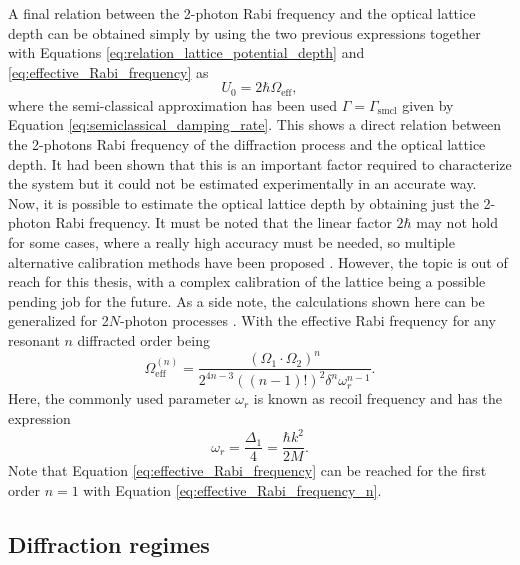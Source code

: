 A final relation between the 2-photon Rabi frequency and the optical lattice depth can be obtained simply by using the two previous expressions together with Equations \eqref{eq:relation_lattice_potential_depth} and \eqref{eq:effective_Rabi_frequency} as \cite{Ovchinnikov1999}
\begin{equation}\label{eq:relation_rabi_frequency_lattice_depth}
	U_0 = 2\hbar\Omega_\text{eff},
\end{equation}
where the semi-classical approximation has been used $\Gamma=\Gamma_\text{smcl}$ given by Equation \eqref{eq:semiclassical_damping_rate}. This shows a direct relation between the 2-photons Rabi frequency of the diffraction process and the optical lattice depth. It had been shown that this is an important factor required to characterize the system but it could not be estimated experimentally in an accurate way. Now, it is possible to estimate the optical lattice depth by obtaining just the 2-photon Rabi frequency. It must be noted that the linear factor $2\hbar$ may not hold for some cases, where a really high accuracy must be needed, so multiple alternative calibration methods have been proposed \cite{Ovchinnikov1999,Cabrera2018, Friebel1998,Cristiani2002}. However, the topic is out of reach for this thesis, with a complex calibration of the lattice being a possible pending job for the future. As a side note, the calculations shown here can be generalized for 2$N$-photon processes \cite{Giltner1995}. With the effective Rabi frequency for any resonant $n$ diffracted order being
\begin{equation}\label{eq:effective_Rabi_frequency_n}
	\Omega_\text{eff}^{(n)} = \frac{(\Omega_1 \cdot \Omega_2)^n}{2^{4n-3}((n-1)!)^2\delta^n\omega_r^{n-1}}.
\end{equation}
Here, the commonly used  parameter $\omega_r$ is known as recoil frequency and has the expression
\begin{equation}
	\omega_r = \frac{\Delta_1}{4} = \frac{\hbar k^2}{2M}.
\end{equation}
Note that Equation \eqref{eq:effective_Rabi_frequency} can be reached for the first order $n=1$ with Equation \eqref{eq:effective_Rabi_frequency_n}. 

\subsection{Diffraction regimes}\label{subsec:diffraction_regimes}

